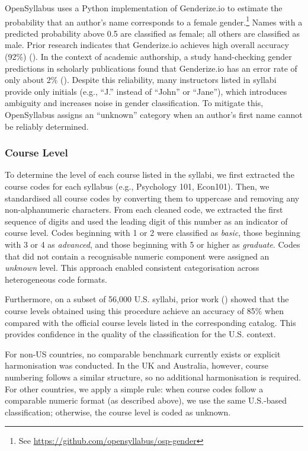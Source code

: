 \documentclass[
  british,
  11pt,
]{article}
\begin{document}
OpenSyllabus uses a Python implementation of Genderize.io to estimate the probability that an author's name corresponds to a female gender.\footnote{See \url{https://github.com/opensyllabus/osp-gender}} Names with a predicted probability above 0.5 are classified as female; all others are classified as male. Prior research indicates that Genderize.io achieves high overall accuracy (92\%) (). In the context of academic authorship, a study hand-checking gender predictions in scholarly publications found that Genderize.io has an error rate of only about 2\% (). Despite this reliability, many instructors listed in syllabi provide only initials (e.g., ``J.'' instead of ``John'' or ``Jane''), which introduces ambiguity and increases noise in gender classification. To mitigate this, OpenSyllabus assigns an ``unknown'' category when an author's first name cannot be reliably determined.

\subsubsection{Course Level}\label{course-level}

To determine the level of each course listed in the syllabi, we first extracted the course codes for each syllabus (e.g., Psychology 101, Econ101). Then, we standardised all course codes by converting them to uppercase and removing any non-alphanumeric characters. From each cleaned code, we extracted the first sequence of digits and used the leading digit of this number as an indicator of course level. Codes beginning with 1 or 2 were classified as \emph{basic}, those beginning with 3 or 4 as \emph{advanced}, and those beginning with 5 or higher as \emph{graduate}. Codes that did not contain a recognisable numeric component were assigned an \emph{unknown} level. This approach enabled consistent categorisation across heterogeneous code formats.

Furthermore, on a subset of 56,000 U.S. syllabi, prior work () showed that the course levels obtained using this procedure achieve an accuracy of 85\% when compared with the official course levels listed in the corresponding catalog. This provides confidence in the quality of the classification for the U.S. context.

For non-US countries, no comparable benchmark currently exists or explicit harmonisation was conducted. In the UK and Australia, however, course numbering follows a similar structure, so no additional harmonisation is required. For other countries, we apply a simple rule: when course codes follow a comparable numeric format (as described above), we use the same U.S.-based classification; otherwise, the course level is coded as unknown.
\end{document}
